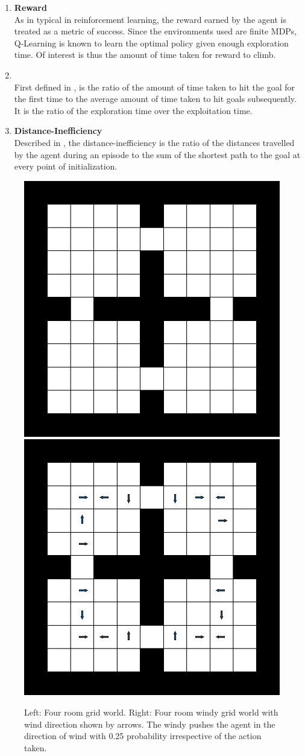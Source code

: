 \begin{enumerate}
    \item \textbf{Reward}\\\noindent
        As in typical in reinforcement learning, the reward earned by
        the agent is treated as a metric of success. Since the
        environments used are finite MDPs, Q-Learning is known to learn
        the optimal policy given enough exploration time. Of interest is
        thus the amount of time taken for reward to climb.

    \item \textbf{\Loo}\\
        First defined in \cite{MiPaViICLR2017}, \Loo is the ratio of the
        amount of time taken to hit the goal for the first time to the
        average amount of time taken to hit goals subsequently. It is
        the ratio of the exploration time over the exploitation time. 

    \item \textbf{Distance-Inefficiency}\\
        Described in \cite{dhiman2018critical}, the
        distance-inefficiency is the ratio of the distances travelled by
        the agent during an episode to the sum of the shortest path to
        the goal at every point of initialization. 
\end{enumerate}


%
\begin{figure}[h!]%
\includegraphics[width=0.48\columnwidth]{media/4-room-grid-world.pdf}
\hfill
\includegraphics[width=0.48\columnwidth]{media/4-room-windy-world.pdf}%
\caption{Left: Four room grid world. Right: Four room windy grid world with wind direction shown by arrows. The windy pushes the agent in the direction of wind with 0.25 probability irrespective of the action taken.}
\label{fig:four-room-grid-world}%
\end{figure}%

